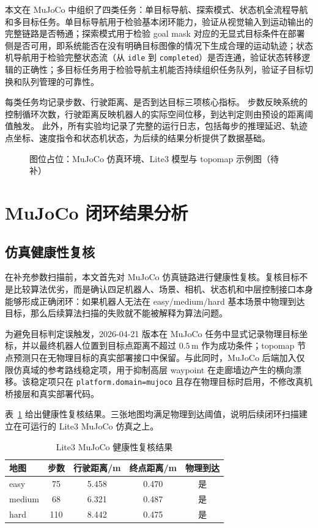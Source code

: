 本文在 MuJoCo 中组织了四类任务：单目标导航、探索模式、状态机全流程导航和多目标任务。单目标导航用于检验基本闭环能力，验证从视觉输入到运动输出的完整链路是否畅通；探索模式用于检验 goal mask 对应的无显式目标条件在部署侧是否可用，即系统能否在没有明确目标图像的情况下生成合理的运动轨迹；状态机导航用于检验完整状态流（从 \texttt{idle} 到 \texttt{completed}）是否连通，验证状态转移逻辑的正确性；多目标任务用于检验导航主机能否持续组织任务队列，验证子目标切换和队列管理的可靠性。

每类任务均记录步数、行驶距离、是否到达目标三项核心指标。
步数反映系统的控制循环次数，行驶距离反映机器人的实际空间位移，到达判定则由预设的距离阈值触发。
此外，所有实验均记录了完整的运行日志，包括每步的推理延迟、轨迹点坐标、速度指令和状态机状态，为后续的结果分析提供了数据基础。

\begin{figure}[htbp]
    \centering
    \fbox{\rule{0pt}{58mm}\rule{0.86\linewidth}{0pt}}
    \caption{图位占位：MuJoCo 仿真环境、Lite3 模型与 topomap 示例图（待补）}
    \label{fig:framework-mujoco-env-placeholder}
\end{figure}

\section{MuJoCo 闭环结果分析}\label{sec:mujoco-results}

\subsection{仿真健康性复核}

在补充参数扫描前，本文首先对 MuJoCo 仿真链路进行健康性复核。复核目标不是比较算法优劣，而是确认四足机器人、场景、相机、状态机和中层控制接口本身能够形成正确闭环：如果机器人无法在 easy/medium/hard 基本场景中物理到达目标，那么后续算法扫描的失败就不能被解释为算法问题。

为避免目标判定误触发，2026-04-21 版本在 MuJoCo 任务中显式记录物理目标坐标，并以最终机器人位置到目标点距离不超过 $0.5\,\mathrm{m}$ 作为成功条件；topomap 节点预测只在无物理目标的真实部署接口中保留。与此同时，MuJoCo 后端加入仅限仿真域的参考路线稳定项，用于抑制高层 waypoint 在走廊墙边产生的横向漂移。该稳定项只在 \texttt{platform.domain=mujoco} 且存在物理目标时启用，不修改真机桥接层和真实部署代码。

表~\ref{tab:mujoco-health-check} 给出健康性复核结果。三张地图均满足物理到达阈值，说明后续闭环扫描建立在可运行的 Lite3 MuJoCo 仿真之上。

\begin{table}[htbp]
    \centering
    \caption{Lite3 MuJoCo 健康性复核结果}
    \label{tab:mujoco-health-check}
    \begin{tabular}{lcccc}
        \toprule
        地图 & 步数 & 行驶距离/m & 终点距离/m & 物理到达 \\
        \midrule
        easy & 75 & 5.458 & 0.470 & 是 \\
        medium & 68 & 6.321 & 0.487 & 是 \\
        hard & 110 & 8.442 & 0.475 & 是 \\
        \bottomrule
    \end{tabular}
\end{table}

